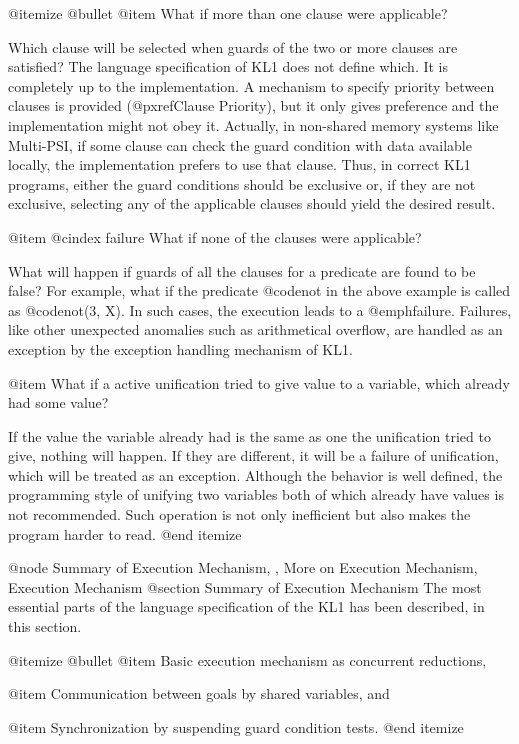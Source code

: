 @itemize @bullet
@item
What if more than one clause were applicable?

Which clause will be selected when guards of the two or more clauses are
satisfied?  The language specification of KL1 does not define which.  It
is completely up to the implementation.  A mechanism to specify priority
between clauses is provided (@pxref{Clause Priority}), but it only gives
preference and the implementation might not obey it.  Actually, in
non-shared memory systems like Multi-PSI, if some clause can check the
guard condition with data available locally, the implementation prefers
to use that clause.  Thus, in correct KL1 programs, either the guard
conditions should be exclusive or, if they are not exclusive, selecting
any of the applicable clauses should yield the desired result.

@item
@cindex failure
What if none of the clauses were applicable?

What will happen if guards of all the clauses for a predicate are found
to be false?  For example, what if the predicate @code{not} in the above
example is called as @code{not(3, X)}.  In such cases, the execution
leads to a @emph{failure}.  Failures, like other unexpected anomalies
such as arithmetical overflow, are handled as an exception by the
exception handling mechanism of KL1.

@item What if a active unification tried to give value to a
variable, which already had some value?

If the value the variable already had is the same as one the unification
tried to give, nothing will happen.  If they are different, it will be a
failure of unification, which will be treated as an exception.  Although
the behavior is well defined, the programming style of unifying two
variables both of which already have values is not recommended.  Such
operation is not only inefficient but also makes the program harder to
read.
@end itemize

@node Summary of Execution Mechanism,  , More on Execution Mechanism, Execution Mechanism
@section Summary of Execution Mechanism
The most essential parts of the language specification of the KL1 has
been described, in this section.

@itemize @bullet
@item
Basic execution mechanism as concurrent reductions,

@item
Communication between goals by shared variables, and

@item
Synchronization by suspending guard condition tests.
@end itemize

